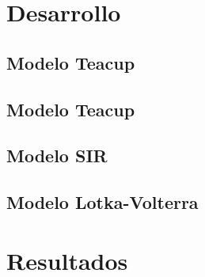 \documentclass[11pt, a4paper]{article}
\begin{document}

\maketitle
\newpage

\tableofcontents
\newpage

%
% 
\section{Desarrollo}

\subsection{Modelo Teacup}

\subsection{Modelo Teacup}


\subsection{Modelo SIR}

\subsection{Modelo Lotka-Volterra}


\section{Resultados}



%
% 
%
\end{document}
